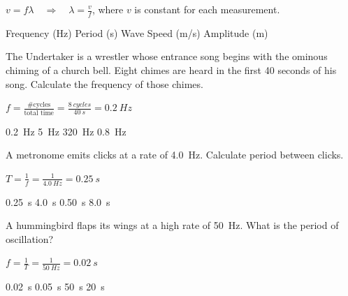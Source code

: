 \documentclass[answers]{exam}
\begin{document}
\begin{questions}
\ifprintanswers
{\color{red}
$v = f \lambda \quad \Rightarrow \quad \lambda = \frac{v}{f}$, where $v$ is constant for each measurement.
}
\fi

\begin{randomizechoices}
    \correctchoice Frequency (Hz)
    \choice Period (s)
    \choice Wave Speed (m/s)
    \choice Amplitude (m)
\end{randomizechoices}

\clearpage

\question
The Undertaker is a wrestler whose entrance song begins with the ominous chiming of a church bell. Eight chimes are heard in the first 40 seconds of his song. Calculate the frequency of those chimes. 

\ifprintanswers
{\color{red}

$f = \frac{\text{\# cycles}}{\text{total time}} = \frac{\SI{8}{cycles}}{\SI{40}{s}} = \boxed{\SI{0.2}{Hz}}$

\medskip
}
\fi


\begin{randomizechoices}
    \correctchoice \SI{0.2}{Hz}
    \choice \SI{5}{Hz}
    \choice \SI{320}{Hz}
    \choice \SI{0.8}{Hz}
\end{randomizechoices}

\question
A metronome emits clicks at a rate of \SI{4.0}{Hz}. Calculate period between clicks. 

\ifprintanswers
{\color{red}
$T = \frac{1}{f} = \frac{1}{\SI{4.0}{Hz}} = \boxed{\SI{0.25}{s}}$

\medskip
}
\fi

\begin{randomizechoices}
    \correctchoice \SI{0.25}{s}
    \choice \SI{4.0}{s}
    \choice \SI{0.50}{s}
    \choice \SI{8.0}{s}
\end{randomizechoices}

\question
A hummingbird flaps its wings at a high rate of \SI{50}{Hz}. What is the period of oscillation?

\ifprintanswers
{\color{red}
$f = \frac{1}{T} = \frac{1}{\SI{50}{Hz}} = \boxed{\SI{0.02}{s}}$

\medskip
}
\fi

\begin{randomizechoices}
    \correctchoice \SI{0.02}{s}
    \choice \SI{0.05}{s}
    \choice \SI{50}{s}
    \choice \SI{20}{s}
\end{randomizechoices}








\end{questions}
\end{document}
